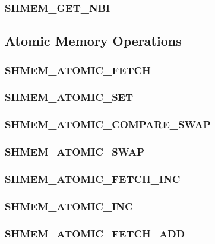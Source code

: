 \documentclass[10pt]{book}
\begin{document}
\subsubsection{\textbf{SHMEM\_GET\_NBI}}\label{subsec:shmem_get_nbi}



\subsection{Atomic Memory Operations}\label{sec:amo}


\subsubsection{\textbf{SHMEM\_ATOMIC\_FETCH}}\label{subsec:shmem_fetch}


\subsubsection{\textbf{SHMEM\_ATOMIC\_SET}}\label{subsec:shmem_set}


\subsubsection{\textbf{SHMEM\_ATOMIC\_COMPARE\_SWAP}}\label{subsec:shmem_cswap}


\subsubsection{\textbf{SHMEM\_ATOMIC\_SWAP}}\label{subsec:shmem_swap}


\subsubsection{\textbf{SHMEM\_ATOMIC\_FETCH\_INC}}\label{subsec:shmem_finc}


\subsubsection{\textbf{SHMEM\_ATOMIC\_INC}}\label{subsec:shmem_inc}


\subsubsection{\textbf{SHMEM\_ATOMIC\_FETCH\_ADD}}\label{subsec:shmem_fadd}

\end{document}
